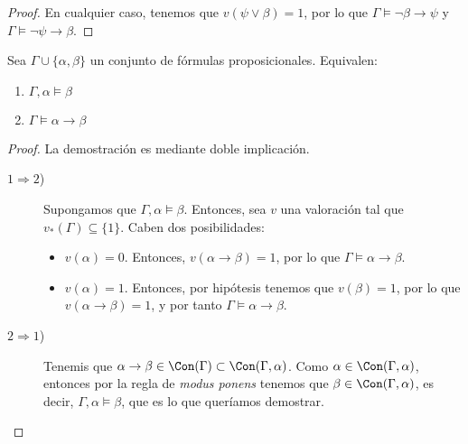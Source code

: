 \begin{ejercicio}
\begin{proof}
        En cualquier caso, tenemos que $v(\psi\lor \beta)=1$, por lo que $\Gamma \vDash \lnot \beta \rightarrow \psi$ y $\Gamma \vDash \lnot \psi \rightarrow \beta$.
    \end{proof}
\end{ejercicio}


\begin{teo}[de la Reducción]
    Sea $\Gamma\cup \{\alpha,\beta\}$ un conjunto de fórmulas proposicionales. Equivalen:
    \begin{enumerate}
        \item $\Gamma,\alpha\vDash \beta$
        \item $\Gamma\vDash \alpha\rightarrow \beta$
    \end{enumerate}
    \begin{proof}
        La demostración es mediante doble implicación.
        \begin{description}
            \item[$1\Longrightarrow 2$)] Supongamos que $\Gamma,\alpha\vDash \beta$.
            Entonces, sea $v$ una valoración tal que $v_\ast(\Gamma)\subseteq \{1\}$.
            Caben dos posibilidades:
            \begin{itemize}
                \item $v(\alpha)=0$. Entonces, $v(\alpha\rightarrow \beta)=1$, por lo que $\Gamma\vDash \alpha\rightarrow \beta$.
                \item $v(\alpha)=1$. Entonces, por hipótesis tenemos que $v(\beta)=1$, por lo que $v(\alpha\rightarrow \beta)=1$, y por tanto $\Gamma\vDash \alpha\rightarrow \beta$.
            \end{itemize}

            \item[$2 \Longrightarrow 1$)] 
            Tenemis que $\alpha\to \beta\in \Con(\Gamma)\subset \Con(\Gamma,\alpha)$.
            Como $\alpha\in \Con(\Gamma,\alpha)$, entonces por la regla de \emph{modus ponens} tenemos que $\beta\in \Con(\Gamma,\alpha)$, es decir, $\Gamma,\alpha\vDash \beta$, que es lo que queríamos demostrar.
        \end{description}
    \end{proof}
\end{teo}

